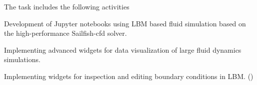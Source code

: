 \begin{task}[
  title=Application: Reproducible research based on GPU,
  id=application-gpu,
  lead=SIL,
  PM=12,
  wphases={4-36},
  partners={}
]
  The task includes the following activities
  \begin{compactitem}
  \item Development of Jupyter notebooks using LBM based fluid simulation based on the high-performance Sailfish-cfd solver.
  \item Implementing advanced widgets for data visualization of large fluid dynamics simulations. 
  \item Implementing widgets for inspection and editing boundary conditions in LBM.
    ()
  \end{compactitem}
  



  
\end{task}
